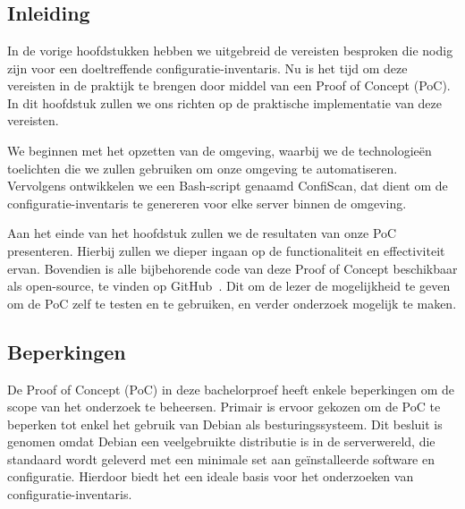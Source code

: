 
\chapter{}
\label{ch:poc}

\section{Inleiding}
\label{poc_inleiding}

In de vorige hoofdstukken hebben we uitgebreid de vereisten besproken die nodig zijn voor een doeltreffende configuratie-inventaris.
Nu is het tijd om deze vereisten in de praktijk te brengen door middel van een Proof of Concept (PoC).
In dit hoofdstuk zullen we ons richten op de praktische implementatie van deze vereisten.

We beginnen met het opzetten van de omgeving, waarbij we de technologie\"en toelichten die we zullen gebruiken om onze omgeving te automatiseren.
Vervolgens ontwikkelen we een Bash-script genaamd ConfiScan, dat dient om de configuratie-inventaris te genereren voor elke server binnen de omgeving.

Aan het einde van het hoofdstuk zullen we de resultaten van onze PoC presenteren.
Hierbij zullen we dieper ingaan op de functionaliteit en effectiviteit ervan.
Bovendien is alle bijbehorende code van deze Proof of Concept beschikbaar als open-source, te vinden op GitHub~\autocite{github-poc}.
Dit om de lezer de mogelijkheid te geven om de PoC zelf te testen en te gebruiken, en verder onderzoek mogelijk te maken.

\section{Beperkingen}
\label{poc_beperkingen}

De Proof of Concept (PoC) in deze bachelorproef heeft enkele beperkingen om de scope van het onderzoek te beheersen.
Primair is ervoor gekozen om de PoC te beperken tot enkel het gebruik van Debian als besturingssysteem.
Dit besluit is genomen omdat Debian een veelgebruikte distributie is in de serverwereld, die standaard wordt geleverd met een minimale set aan ge\"installeerde software en configuratie.
Hierdoor biedt het een ideale basis voor het onderzoeken van configuratie-inventaris.


